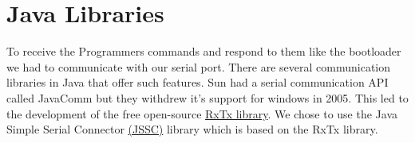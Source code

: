 \section{Java Libraries}
To receive the Programmers commands and respond to them like the bootloader we had to communicate with our serial port. There are several communication libraries in Java that offer such features. Sun had a serial communication API called JavaComm but they withdrew it's support for windows in 2005. This led to the development of the free open-source \href{http://rxtx.qbang.org/wiki/index.php/Main_Page}{RxTx library}. We chose to use the Java Simple Serial Connector \href{https://code.google.com/p/java-simple-serial-connector/}{(JSSC)} library which is based on the RxTx library.

\clearpage  %
